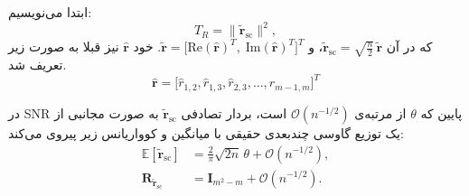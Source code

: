 ابتدا می‌نویسیم:
\begin{equation}
	T_{R}=\|\tilde{\mathbf{r}}_{\mathrm{sc}}\|^{2},
\end{equation}
که در آن 
\(\tilde{\mathbf{r}}_{\mathrm{sc}}=\sqrt{\tfrac{n}{2}}\,\tilde{\mathbf{r}}\)،  
و 
\(\tilde{\mathbf{r}}=\big[\mathrm{Re}(\hat{\mathbf{r}})^{T},\;\mathrm{Im}(\hat{\mathbf{r}})^{T}\big]^{T}\).  
خود
$\hat{\mathbf{r}}$
نیز قبلا به صورت زیر تعریف شد.
\[
\hat{\mathbf{r}}=\big[\hat r_{1,2},\hat r_{1,3},\hat r_{2,3},\ldots,\hat r_{m-1,m}\big]^{T}
\]
\begin{قضیه}
در SNR پایین که $\theta$ از مرتبه‌ی $\mathcal{O}(n^{-1/2})$ است،  
بردار تصادفی
$\tilde{\mathbf{r}}_{\mathrm{sc}}$
به صورت مجانبی از یک توزیع گاوسی چندبعدی حقیقی با میانگین و کوواریانس زیر پیروی می‌کند:
\begin{align}
	\mathbb{E}[\tilde{\mathbf{r}}_{\mathrm{sc}}]
	&=\frac{2}{\pi}\sqrt{2n}\,\theta+\mathcal{O}(n^{-1/2}),\\
	\mathbf{R}_{\tilde{\mathbf{r}}_{\mathrm{sc}}}
	&=\mathbf{I}_{m^{2}-m}+\mathcal{O}(n^{-1/2}).
\end{align}
\end{قضیه}
